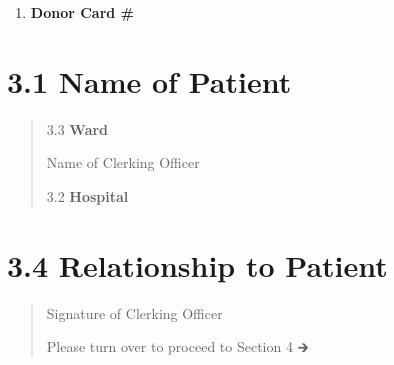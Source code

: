 \documentclass[]{article}
\begin{document}
\begin{enumerate}
\def\labelenumi{\arabic{enumi}.}
\setcounter{enumi}{2}
\item
  \textbf{\hfill\break
  Donor Card \#}
\end{enumerate}

\hypertarget{name-of-patient}{%
\section*{\texorpdfstring{3.1 Name of Patient
}{3.1 Name of Patient }}\label{name-of-patient}}

\begin{quote}
3.3 \textbf{Ward}

Name of Clerking Officer

3.2 \textbf{Hospital}
\end{quote}

\hypertarget{relationship-to-patient}{%
\section*{\texorpdfstring{3.4 Relationship to Patient
}{3.4 Relationship to Patient }}\label{relationship-to-patient}}

\begin{quote}
Signature of Clerking Officer

Please turn over to proceed to Section 4 🡲
\end{quote}
\end{document}
